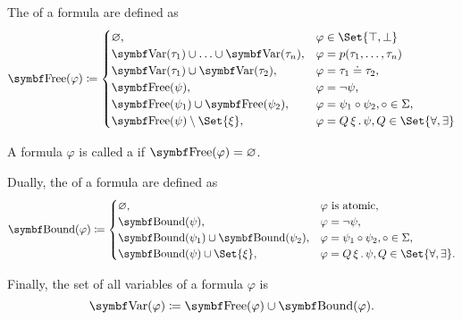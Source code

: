 \begin{definition}
\begin{DefEnum}
     The  of a formula are defined as
    \begin{equation}\label{eq:def:first_order_syntax/formula_free_variables}
      \Bold{Free}(\varphi) \coloneqq \begin{cases}
        \varnothing,                                            &\varphi \in \Set{ \top, \bot } \\
        \Bold{Var}(\tau_1) \cup \ldots \cup \Bold{Var}(\tau_n), &\varphi = p(\tau_1, \ldots, \tau_n) \\
        \Bold{Var}(\tau_1) \cup \Bold{Var}(\tau_2),             &\varphi = \tau_1 \doteq \tau_2, \\
        \Bold{Free}(\psi),                                      &\varphi = \neg \psi, \\
        \Bold{Free}(\psi_1) \cup \Bold{Free}(\psi_2),           &\varphi = \psi_1 \circ \psi_2, \circ \in \Sigma, \\
        \Bold{Free}(\psi) \setminus \Set{ \xi },                &\varphi = \Qnt{Q}{\xi} \psi, Q \in \Set{ \forall, \exists }
      \end{cases}
    \end{equation}

     A formula \( \varphi \) is called a  if \( \Bold{Free}(\varphi) = \varnothing \).

     Dually, the  of a formula are defined as
    \begin{equation}\label{eq:def:first_order_syntax/formula_bound_variables}
      \Bold{Bound}(\varphi) \coloneqq \begin{cases}
        \varnothing,                                    &\varphi \text{ is atomic}, \\
        \Bold{Bound}(\psi),                             &\varphi = \neg \psi, \\
        \Bold{Bound}(\psi_1) \cup \Bold{Bound}(\psi_2), &\varphi = \psi_1 \circ \psi_2, \circ \in \Sigma, \\
        \Bold{Bound}(\psi) \cup \Set{ \xi },            &\varphi = \Qnt{Q}{\xi} \psi, Q \in \Set{ \forall, \exists }.
      \end{cases}
    \end{equation}

     Finally, the set of all variables of a formula \( \varphi \) is
    \begin{equation}\label{eq:def:first_order_syntax/formula_variables}
      \Bold{Var}(\varphi) \coloneqq \Bold{Free}(\varphi) \cup \Bold{Bound}(\varphi).
    \end{equation}
  \end{DefEnum}
\end{definition}

